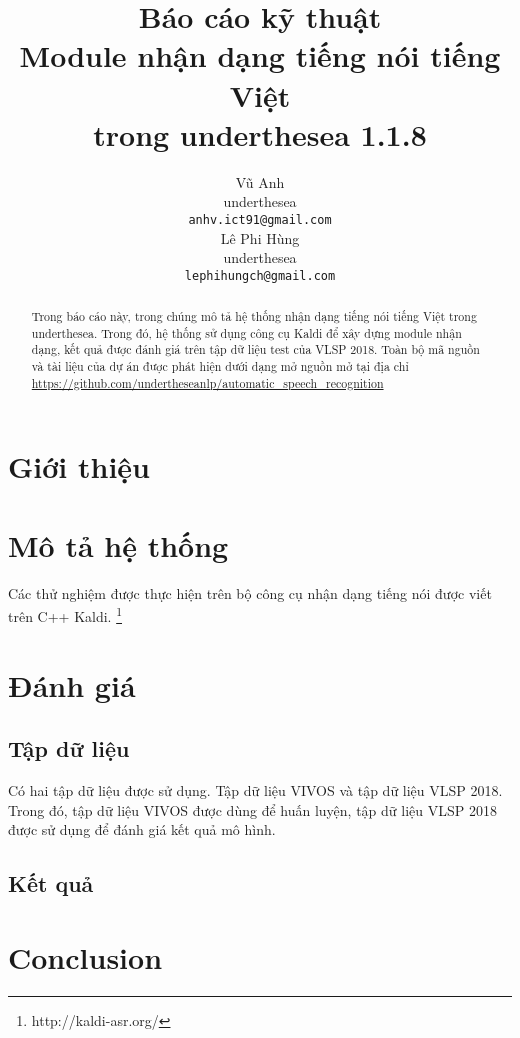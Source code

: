 \documentclass[11pt,a4paper]{article}
\title{Báo cáo kỹ thuật\\Module nhận dạng tiếng nói tiếng Việt\\ trong underthesea 1.1.8}
\author{
Vũ Anh\\
underthesea\\
{\tt anhv.ict91@gmail.com} \\
\And
Lê Phi Hùng \\
underthesea\\
{\tt lephihungch@gmail.com} \\
}
\date{}
\begin{document}
\maketitle
\begin{abstract}
Trong báo cáo này, trong chúng mô tả hệ thống nhận dạng tiếng nói tiếng Việt trong underthesea. Trong đó, hệ thống sử dụng công cụ Kaldi để xây dựng module nhận dạng, kết quả được đánh giá trên tập dữ liệu test của VLSP 2018. Toàn bộ mã nguồn và tài liệu của dự án được phát hiện dưới dạng mở nguồn mở tại địa chỉ \url{https://github.com/undertheseanlp/automatic_speech_recognition}

\end{abstract}

\section{Giới thiệu}


\section{Mô tả hệ thống}

Các thử nghiệm được thực hiện trên bộ công cụ nhận dạng tiếng nói được viết trên C++ Kaldi. \footnote{http://kaldi-asr.org/}


\section{Đánh giá}

\subsection{Tập dữ liệu}

Có hai tập dữ liệu được sử dụng. Tập dữ liệu VIVOS và tập dữ liệu VLSP 2018. Trong đó, tập dữ liệu VIVOS được dùng để huấn luyện, tập dữ liệu VLSP 2018 được sử dụng để đánh giá kết quả mô hình.

\subsection{Kết quả}


\section{Conclusion}




\end{document}
